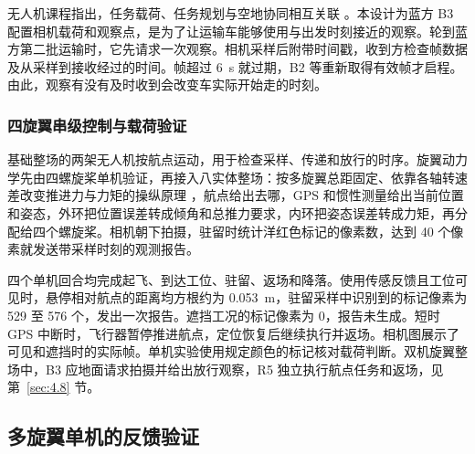 无人机课程指出，任务载荷、任务规划与空地协同相互关联 \cite{ref3}。本设计为蓝方 B3 配置相机载荷和观察点，是为了让运输车能够使用与出发时刻接近的观察。轮到蓝方第二批运输时，它先请求一次观察。相机采样后附带时间戳，收到方检查帧数据及从采样到接收经过的时间。帧超过 6~s 就过期，B2 等重新取得有效帧才启程。由此，观察有没有及时收到会改变车实际开始走的时刻。

\subsubsection*{四旋翼串级控制与载荷验证}

基础整场的两架无人机按航点运动，用于检查采样、传递和放行的时序。旋翼动力学先由四螺旋桨单机验证，再接入八实体整场：按多旋翼总距固定、依靠各轴转速差改变推进力与力矩的操纵原理 \cite{ref3}，航点给出去哪，GPS 和惯性测量给出当前位置和姿态，外环把位置误差转成倾角和总推力要求，内环把姿态误差转成力矩，再分配给四个螺旋桨。相机朝下拍摄，驻留时统计洋红色标记的像素数，达到 40 个像素就发送带采样时刻的观测报告。

四个单机回合均完成起飞、到达工位、驻留、返场和降落。使用传感反馈且工位可见时，悬停相对航点的距离均方根约为 0.053~m，驻留采样中识别到的标记像素为 529 至 576 个，发出一次报告。遮挡工况的标记像素为 0，报告未生成。短时 GPS 中断时，飞行器暂停推进航点，定位恢复后继续执行并返场。相机图展示了可见和遮挡时的实际帧。单机实验使用规定颜色的标记核对载荷判断。双机旋翼整场中，B3 应地面请求拍摄并给出放行观察，R5 独立执行航点任务和返场，见第~\ref{sec:4.8} 节。


\subsection{多旋翼单机的反馈验证}\label{sec:2.8}

